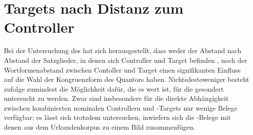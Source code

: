 \section{Targets nach Distanz zum Controller}
\label{sec:kctargdist}

Bei der Untersuchung des \CAO{} hat sich herausgestellt, dass weder
der  Abstand nach Abstand der Satzglieder, in denen sich
Controller und Target befinden%
, noch der Wortformen\-abstand
zwischen Contoller und Target einen signifikanten Einfluss auf die Wahl der
Kongruenzform des Quantors haben. Nichtsdestoweniger besteht
\citet{corbett1979} zufolge zumindest die Möglichkeit dafür, die es wert ist,
für die \KC{} gesondert untersucht zu werden. Zwar sind insbesondere
für die direkte Abhängigkeit zwischen kombinierten nominalen Controllern und
-Targets nur wenige Belege verfügbar; es lässt sich trotzdem
unter\-suchen, inwiefern sich die \KC{}-Belege mit denen aus dem
Urkundenkorpus zu einem Bild zusammenfügen.




